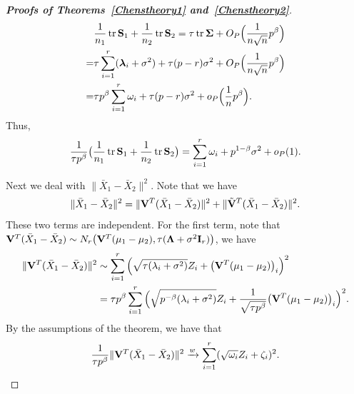 \documentclass[review]{elsarticle}
\DeclareMathOperator{\mytr}{tr}
\newcommand{\bfsym}[1]{\ensuremath{\boldsymbol{#1}}}
\def\blambda {\bfsym {\lambda}}        \def\bLambda {\bfsym {\Lambda}}
\theoremstyle{plain}
\theoremstyle{definition}
\theoremstyle{remark}
\begin{document}
\begin{appendices}
\begin{proof}[\textbf{Proofs of Theorems~\ref{Chenstheory1} and~\ref{Chenstheory2}}]
$$\begin{aligned}
        &\frac{1}{n_1}\mytr \BS_1+\frac{1}{n_2}\mytr \BS_2=
    \tau \mytr \bSigma+O_P\Big(\frac{1}{n\sqrt{n}}p^{\beta}\Big)\\
        =&\tau \sum_{i=1}^r (\blambda_i+\sigma^2)+\tau(p-r)\sigma^2+O_P\Big(\frac{1}{n\sqrt{n}}p^{\beta}\Big)\\
        =&\tau p^{\beta} \sum_{i=1}^r \omega_i+\tau(p-r)\sigma^2+o_P\Big(\frac{1}{n}p^{\beta}\Big).
    \end{aligned}
    $$
Thus,
        \begin{equation}\label{eq:kkk1}
        \frac{1}{\tau p^\beta}\big(\frac{1}{n_1}\mytr \BS_1+\frac{1}{n_2}\mytr \BS_2\big)
        =\sum_{i=1}^r \omega_i+p^{1-\beta}\sigma^2+o_P(1).
        \end{equation}

    Next we deal with $\|\bar{X}_1-\bar{X}_2\|^2$.
    Note that we have
    $$
    \|\bar{X}_1-\bar{X}_2\|^2=
    \|\mathbf{V}^T(\bar{X}_1-\bar{X}_2)\|^2+
    \|\tilde{\mathbf{V}}^T(\bar{X}_1-\bar{X}_2)\|^2.
    $$
    These two terms are independent.
    For the first term, note that $\BV^T(\bar{X}_1-\bar{X}_2)\sim N_r\big(\BV^T (\mu_1-\mu_2),\tau (\bLambda+\sigma^2 \BI_r)\big)$, we have
    $$
    \begin{aligned}
        \|\mathbf{V}^T(\bar{X}_1-\bar{X}_2)\|^2&\sim
        \sum_{i=1}^r \Big(\sqrt{\tau (\lambda_i+\sigma^2)}Z_i+\big(\mathbf{V}^T (\mu_1-\mu_2)\big)_i \Big)^2\\
        &=\tau p^{\beta}
        \sum_{i=1}^r
        \Big( \sqrt{p^{-\beta}(\lambda_i+\sigma^2)}Z_i+\frac{1}{\sqrt{\tau p^{\beta}}}\big(\mathbf{V}^T (\mu_1-\mu_2)\big)_i \Big)^2.
    \end{aligned}
    $$
    By the assumptions of the theorem,  we have that
    \begin{equation}\label{eq:kkk2}
    \begin{aligned}
        \frac{1}{\tau p^{\beta}}\|\mathbf{V}^T(\bar{X}_1-\bar{X}_2)\|^2
        \xrightarrow{w}
        \sum_{i=1}^r (\sqrt{\omega_i} Z_i+\zeta_i)^2.
    \end{aligned}
    \end{equation}


\end{proof}
\end{appendices}
\end{document}
